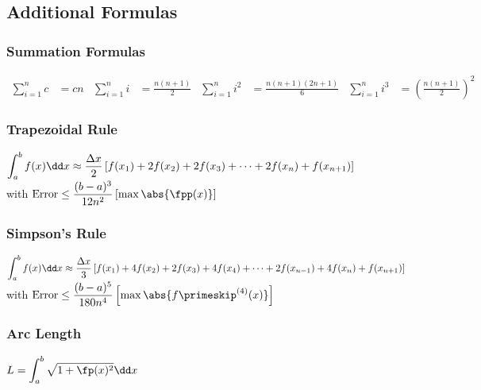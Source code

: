 \clearpage

\subsection{Additional Formulas}

\vfill

\subsubsection*{Summation Formulas}\vspace{-\baselineskip}

\begin{align*}
\sum^n_{i=1}{c} &= cn
&
\sum^n_{i=1}{i} &= \frac{n(n+1)}{2}
&
\sum^n_{i=1}{i^2} &= \frac{n(n+1)(2n+1)}{6}
&
\sum^n_{i=1}{i^3} &= \left(\frac{n(n+1)}{2}\right)^2
\end{align*}

\vfill

\subsubsection*{Trapezoidal Rule}

\noindent$\ds\int_a^b{f(x)}\dd x \approx \frac{\Delta x}{2}\left[f(x_1)+2f(x_2) + 2f(x_3) + \dotsb + 2f(x_{n}) + f(x_{n+1})\right]$\smallskip\\
with  $\text{Error} \leq \dfrac{(b-a)^3}{12n^2}\left[ \max \abs{\fpp(x)}\right]$

\vfill

\subsubsection*{Simpson's Rule}

\noindent$\ds\int_a^b{f(x)}\dd x \approx \frac{\Delta x}{3}\left[f(x_1)+4f(x_2) + 2f(x_3) + 4f(x_4) + \dotsb + 2f(x_{n-1}) + 4f(x_{n}) + f(x_{n+1})\right] 
$\smallskip\\
with $\text{Error} \leq \dfrac{(b-a)^5}{180n^4}\left[ \max \abs{f\primeskip^{(4)}(x)}\right]$

\vfill

\subsubsection*{Arc Length}

\noindent
$\ds L = \int_a^b{\sqrt{1+ \fp(x)^2}}\dd x$

\vfill


